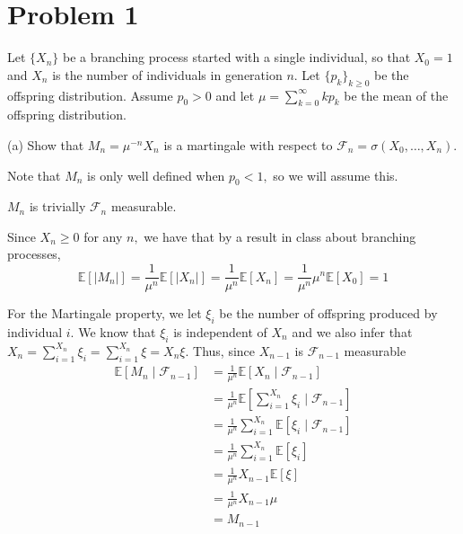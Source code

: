 \documentclass[11pt]{article}
\newcommand{\bbE}{\mathbb{E}}
\begin{document}
	
	
	\psetheader
\section*{Problem 1}
Let \(\{X_n\}\) be a branching process started with a single individual, so that \(X_0 = 1\) and \(X_n\) is the number of individuals in generation \(n\). Let \(\{p_k\}_{k \geq 0}\) be the offspring distribution. Assume \(p_0 > 0\) and let \(\mu = \sum_{k=0}^\infty k p_k\) be the mean of the offspring distribution.

(a) Show that \(M_n = \mu^{-n} X_n\) is a martingale with respect to \(\mathcal{F}_n = \sigma(X_0, \ldots, X_n)\).
\begin{solution}
Note that $M_n$ is only well defined when $p_0 <1,$ so we will assume this. 

    $M_n$ is trivially $\mathcal{F}_n$ measurable. 

    Since $X_n \geq 0$ for any $n,$ we have that by a result in class about branching processes,
    \[\bbE[|M_n|] = \frac{1}{\mu^n}\bbE[|X_n|] =\frac{1}{\mu^n}\bbE[X_n]= \frac{1}{\mu^n}\mu^n \bbE[X_0] = 1  \]

    For the Martingale property, we let $\xi_i$ be the number of offspring produced by  individual $i$. We know that $\xi_i$ is independent of $X_n$ and we also infer that $X_{n} = \sum_{i=1}^{X_n}\xi_i = \sum_{i=1}^{X_n}\xi = X_n\xi.$ Thus, since $X_{n-1}$ is $\mathcal{F}_{n-1}$ measurable
    \begin{align*}
        \bbE[M_n \mid \mathcal{F}_{n-1}] &= \frac{1}{\mu^n}\bbE[X_n \mid \mathcal{F}_{n-1}]\\
        &= \frac{1}{\mu^n}\bbE[\sum_{i=1}^{X_n}\xi_i \mid \mathcal{F}_{n-1}]\\
        &=\frac{1}{\mu^n}\sum_{i=1}^{X_n}\bbE[\xi_i \mid \mathcal{F}_{n-1}]\\
        &=\frac{1}{\mu^n}\sum_{i=1}^{X_n}\bbE[\xi_i]\\
        &= \frac{1}{\mu^n}X_{n-1} \bbE[\xi]\\
        &= \frac{1}{\mu^n}X_{n-1} \mu\\
        &= M_{n-1}
    \end{align*}
\end{solution}
\end{document}
